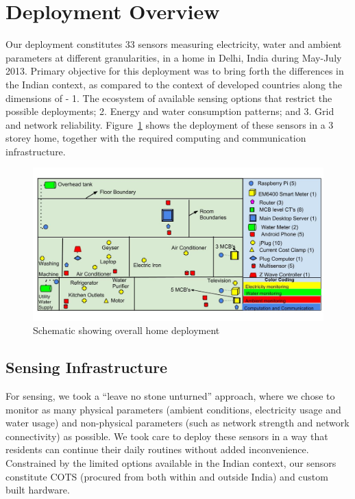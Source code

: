 \documentclass[10pt]{sensys-proc}
\newcommand{\figref}[1]{Figure~\ref{#1}}
\begin{document}
\section{Deployment Overview}
Our deployment constitutes 33 sensors measuring electricity, water and ambient parameters at different granularities, in a home in Delhi, India during May-July 2013. Primary objective for this deployment was to bring forth the differences in the Indian context, as compared to the context of developed countries along the dimensions of - 1. The ecosystem of available sensing options that restrict the possible deployments; 2. Energy and water consumption patterns; and 3. Grid and network reliability. \figref{fig:overall} shows the deployment of these sensors in a 3 storey home, together with the required computing and communication infrastructure. %

\begin{figure} 
	\vspace{-5mm}    
    \includegraphics[scale=0.19]{./figures/overall_deployment.jpg}
    \vspace{-10mm}    
    \caption{Schematic showing overall home deployment}   
    \label{fig:overall}
\end{figure}

\subsection{Sensing Infrastructure}
\label{sec:sensing}
For sensing, we took a ``leave no stone unturned'' approach, where  we chose to monitor as many physical parameters (ambient conditions, electricity usage and water usage) and non-physical parameters (such as network strength and network connectivity) as possible. We took care to deploy these sensors in a way that residents can continue their daily routines without added inconvenience. Constrained by the limited options available in the Indian context, our sensors constitute COTS (procured from both within and outside India) and custom built hardware. %
\end{document}
